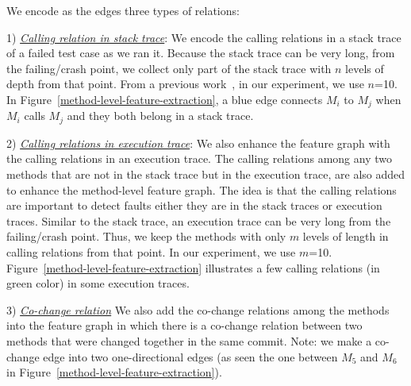   We encode as the edges three types of relations:

1) {\em \underline{Calling relation in stack trace}}: We encode the
calling relations in a stack trace of a failed
test case as we ran it. Because the stack trace can be very long, from
the failing/crash point, we collect only part of the stack trace with
$n$ levels of depth from that point. From a previous
work~\cite{crashlocator-issta14}, in our experiment, we use $n$=10. In
Figure~\ref{method-level-feature-extraction}, a blue edge connects
$M_i$ to $M_j$ when $M_i$ calls $M_j$ and they both belong in a stack
trace.


2) {\em \underline{Calling relations in execution trace}}:
We also enhance the feature graph with the calling relations in an
execution trace. The calling relations among any two
methods that are not in the stack trace but in the execution trace,
are also added to enhance the method-level feature graph. The idea is
that the calling relations are important to detect faults either they
are in the stack traces or execution traces. Similar to the stack
trace, an execution trace can be very long from the failing/crash
point. Thus, we keep the methods with only $m$ levels of length in
calling relations from that point. In our experiment, we use
$m$=10. Figure~\ref{method-level-feature-extraction} illustrates a few
calling relations (in green color) in some execution traces.

3) {\em \underline{Co-change relation}} We also add the
co-change relations among the methods into the feature
graph in which there is a co-change relation between two methods that
were changed together in the same commit. Note: we make a co-change
edge into two one-directional edges (as seen the one between $M_5$ and
$M_6$ in Figure~\ref{method-level-feature-extraction}).


